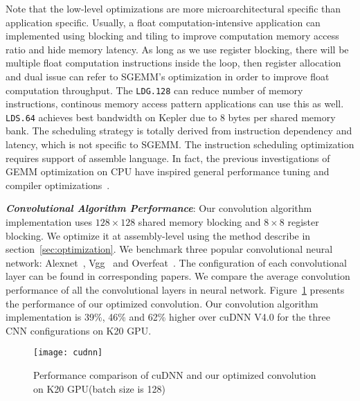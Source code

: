 Note that the low-level optimizations are more microarchitectural specific than application specific. 
Usually, a float computation-intensive application can implemented using
blocking and tiling to improve computation memory access ratio and hide memory latency. As long as we use
register blocking, there will be multiple float computation instructions inside
the loop, then register allocation and dual issue can refer to SGEMM's
optimization in order to improve float computation throughput. 
The {\tt LDG.128} can reduce number of memory instructions, continous memory
access pattern applications can use this as well.
{\tt LDS.64} achieves best bandwidth on Kepler due to 8 bytes per shared memory bank. 
The scheduling strategy is totally derived from instruction dependency and latency,
which is not specific to SGEMM. 
The instruction scheduling optimization requires support of assemble language.
In fact, the previous investigations of GEMM optimization on CPU have inspired
general performance tuning and compiler optimizations~\cite{lam1991cache}.  

{\em {\bf Convolutional Algorithm Performance}}:
Our convolution algorithm implementation uses $128\times128$ shared memory blocking and
$8\times8$ register blocking. We optimize it at assembly-level using the method describe in section~\ref{sec:optimization}.
We benchmark three popular convolutional neural network:
Alexnet~\cite{krizhevsky2012imagenet}, Vgg~\cite{simonyan2014very} and
Overfeat~\cite{sermanet2013overfeat}.  The configuration of each convolutional
layer can be found in corresponding papers.
We compare the average convolution performance of all the convolutional layers in neural network. 
Figure~\ref{fig:conv} presents the performance of our optimized convolution. %
Our convolution algorithm implementation is 39\%, 46\% and 62\% higher over cuDNN V4.0 for the three CNN configurations on K20 GPU.

\begin{figure}[htbp]
\begin{center}
\texttt{[image: cudnn]}
    \caption{Performance comparison of cuDNN and our optimized convolution on K20 GPU(batch size is 128)}
\label{fig:conv}
\end{center}
\end{figure}
